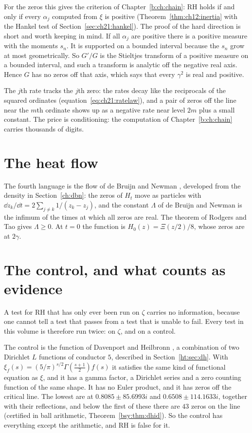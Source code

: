 For the zeros this gives the criterion of Chapter~\ref{b:ch:chain}: RH holds if and only if every $\alpha_j$ computed from $\xi$ is positive (Theorem~\ref{thm:ch12:inertia} with the Hankel test of Section~\ref{sec:ch21:hankel}). The proof of the hard direction is short and worth keeping in mind. If all $\alpha_j$ are positive there is a positive measure with the moments $s_n$. It is supported on a bounded interval because the $s_n$ grow at most geometrically. So $G'/G$ is the Stieltjes transform of a positive measure on a bounded interval, and such a transform is analytic off the negative real axis. Hence $G$ has no zeros off that axis, which says that every $\gamma^2$ is real and positive.

The $j$th rate tracks the $j$th zero: the rates decay like the reciprocals of the squared ordinates (equation~\eqref{eq:ch21:ratelaw}), and a pair of zeros off the line near the $m$th ordinate shows up as a negative rate near level $2m$ plus a small constant. The price is conditioning: the computation of Chapter~\ref{b:ch:chain} carries thousands of digits.

\section{The heat flow}\label{t:sec:heat}

The fourth language is the flow of de Bruijn \cite{deBruijn} and Newman \cite{Newman1976}, developed from the density in Section~\ref{ch:dbn}: the zeros of $H_t$ move as particles with $\dd z_k/\dd t=2\sum_{j\ne k}1/(z_k-z_j)$, and the constant $\Lambda$ of de Bruijn and Newman is the infimum of the times at which all zeros are real. The theorem of Rodgers and Tao \cite{RodgersTao} gives $\Lambda\ge0$. At $t=0$ the function is $H_0(z)=\Xi(z/2)/8$, whose zeros are at $2\gamma$.

\section{The control, and what counts as evidence}\label{t:sec:control}

A test for RH that has only ever been run on $\zeta$ carries no information, because one cannot tell a test that passes from a test that is unable to fail. Every test in this volume is therefore run twice: on $\zeta$, and on a control.

The control is the function of Davenport and Heilbronn \cite{DH36}, a combination of two Dirichlet $L$ functions of conductor $5$, described in Section~\ref{ht:sec:dh}. With $\xi_f(s)=(5/\pi)^{s/2}\Gamma(\frac{s+1}{2})f(s)$ it satisfies the same kind of functional equation as $\xi$, and it has a gamma factor, a Dirichlet series and a zero counting function of the same shape. It has no Euler product, and it has zeros off the critical line. The lowest are at $0.8085\pm85.6993i$ and $0.6508\pm114.1633i$, together with their reflections, and below the first of these there are $43$ zeros on the line (certified in ball arithmetic, Theorem~\ref{bsy:thm:dhid}). So the control has everything except the arithmetic, and RH is false for it.

